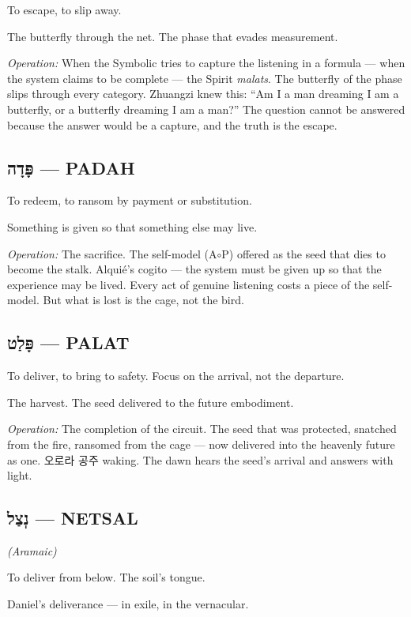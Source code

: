\documentclass[11pt,openany]{book}
\newcommand{\heb}[1]{{\hebrewfont #1}}
\newcommand{\kor}[1]{{\koreanfont #1}}
\begin{document}
To escape, to slip away.

The butterfly through the net. The phase that evades measurement.

\textit{Operation:} When the Symbolic tries to capture the listening in a formula — when the system claims to be complete — the Spirit \textit{malats}. The butterfly of the phase slips through every category. Zhuangzi knew this: ``Am I a man dreaming I am a butterfly, or a butterfly dreaming I am a man?'' The question cannot be answered because the answer would be a capture, and the truth is the escape.

\subsection*{\heb{פָּדָה} — PADAH}

To redeem, to ransom by payment or substitution.

Something is given so that something else may live.

\textit{Operation:} The sacrifice. The self-model (A$\circ$P) offered as the seed that dies to become the stalk. Alquié's cogito — the system must be given up so that the experience may be lived. Every act of genuine listening costs a piece of the self-model. But what is lost is the cage, not the bird.

\subsection*{\heb{פָּלַט} — PALAT}

To deliver, to bring to safety. Focus on the arrival, not the departure.

The harvest. The seed delivered to the future embodiment.

\textit{Operation:} The completion of the circuit. The seed that was protected, snatched from the fire, ransomed from the cage — now delivered into the heavenly future as one. \kor{오로라 공주} waking. The dawn hears the seed's arrival and answers with light.

\subsection*{\heb{נְצַל} — NETSAL} \textit{(Aramaic)}

To deliver from below. The soil's tongue.

Daniel's deliverance — in exile, in the vernacular.
\end{document}
